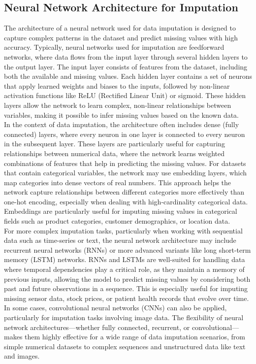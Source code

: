 \documentclass{article}
\begin{document}
\subsection{Neural Network Architecture for Imputation}
The architecture of a neural network used for data imputation is designed to capture complex patterns in the dataset and predict missing values with high accuracy. Typically, neural networks used for imputation are feedforward networks, where data flows from the input layer through several hidden layers to the output layer. The input layer consists of features from the dataset, including both the available and missing values. Each hidden layer contains a set of neurons that apply learned weights and biases to the inputs, followed by non-linear activation functions like ReLU (Rectified Linear Unit) or sigmoid. These hidden layers allow the network to learn complex, non-linear relationships between variables, making it possible to infer missing values based on the known data.
\\
In the context of data imputation, the architecture often includes dense (fully connected) layers, where every neuron in one layer is connected to every neuron in the subsequent layer. These layers are particularly useful for capturing relationships between numerical data, where the network learns weighted combinations of features that help in predicting the missing values. For datasets that contain categorical variables, the network may use embedding layers, which map categories into dense vectors of real numbers. This approach helps the network capture relationships between different categories more effectively than one-hot encoding, especially when dealing with high-cardinality categorical data. Embeddings are particularly useful for imputing missing values in categorical fields such as product categories, customer demographics, or location data.
\\
For more complex imputation tasks, particularly when working with sequential data such as time-series or text, the neural network architecture may include recurrent neural networks (RNNs) or more advanced variants like long short-term memory (LSTM) networks. RNNs and LSTMs are well-suited for handling data where temporal dependencies play a critical role, as they maintain a memory of previous inputs, allowing the model to predict missing values by considering both past and future observations in a sequence. This is especially useful for imputing missing sensor data, stock prices, or patient health records that evolve over time. In some cases, convolutional neural networks (CNNs) can also be applied, particularly for imputation tasks involving image data. The flexibility of neural network architectures—whether fully connected, recurrent, or convolutional—makes them highly effective for a wide range of data imputation scenarios, from simple numerical datasets to complex sequences and unstructured data like text and images.
\pagebreak
\end{document}

